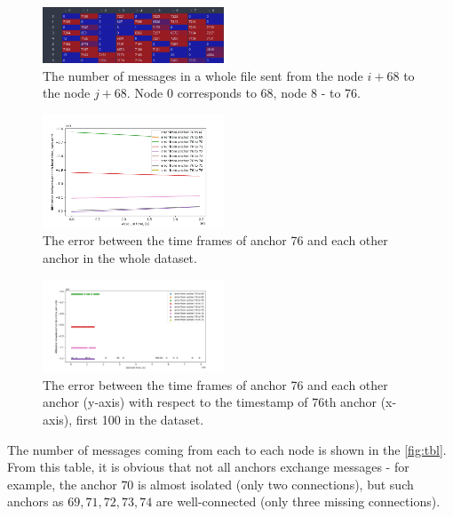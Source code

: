 \documentclass[journal]{IEEEtran}
\begin{document}
\begin{figure}[ht]
    \centering
    \includegraphics[width=0.48\textwidth]{graphics/stat_exchange.png}
    \caption{The number of messages in a whole file sent from the node $i+68$ to the node $j+68$. Node 0 corresponds to 68, node 8 - to 76.}
    \label{fig:tbl}
\end{figure}
\begin{figure}[ht]
    \centering
    \includegraphics[width=0.48\textwidth]{graphics/errors.png}
    \caption{The error between the time frames of anchor 76 and each other anchor in the whole dataset.}
    \label{fig:stat_all}
\end{figure}
\begin{figure}[ht]
    \centering
    \includegraphics[width=0.48\textwidth]{graphics/errors_scaled.png}
    \caption{The error between the time frames of anchor 76 and each other anchor (y-axis) with respect to the timestamp of 76th anchor (x-axis), first 100 in the dataset.}
    \label{fig:stat_cropped}
\end{figure}

The number of messages coming from each to each node is shown in the \autoref{fig:tbl}. From this table, it is obvious that not all anchors exchange messages - for example, the anchor $70$ is almost isolated (only two connections), but such anchors as $69, 71, 72, 73, 74 $ are well-connected (only three missing connections).
\end{document}
